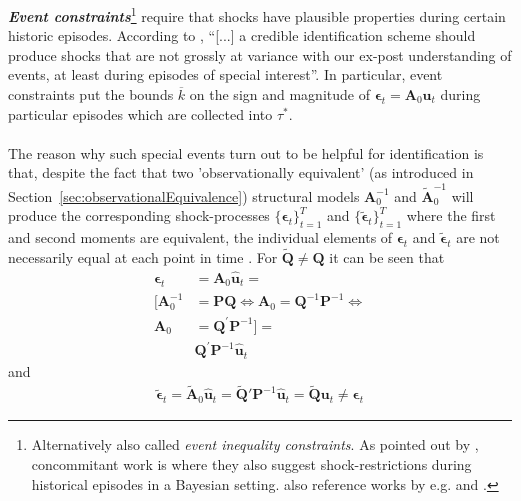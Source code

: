 \documentclass[a4paper,11pt,listof=nochaptergap,oneside,pointednumbers,bibtotoc,bigheadings,liststotoc,hidelinks]{scrbook}
\theoremstyle{mysatz}
\theoremstyle{mydefinition}
\theoremstyle{mytheorem}
\theoremstyle{mybemerkung}
\let\oldhat\hat
\newcommand{\vect}[1]{\boldsymbol{\mathbf{#1}}}
\newcommand{\hatt}[1]{\oldhat{\boldsymbol{\mathbf{#1}}}}
\begin{document}
\textbf{\textit{Event constraints}}\footnote{Alternatively also called \textit{event inequality constraints}. As pointed out by \citet{ludvigsonetal:19}, concommitant work is \citet{diazramirez:18} where they also suggest shock-restrictions during historical episodes in a Bayesian setting. \citet{ludvigsonetal:20a} also reference works by e.g. \citet{cieslakschrimpf:19} and \citet{zeev:18}.} require that shocks have plausible properties during certain historic episodes. According to \citet[p. 11]{ludvigsonetal:19}, ``[...] a credible identification scheme should produce shocks that are not grossly at variance with our ex-post understanding of events, at least during episodes of special interest''.  In particular, event constraints put the bounds $\overline{k}$ on the sign and magnitude of $\vect{\epsilon}_t = \vect{A}_0\vect{u}_t$ during particular episodes which are collected into $\tau^*$. \\
\\
The reason why such special events turn out to be helpful for identification is that, despite the fact that two 'observationally equivalent' (as introduced in Section~\ref{sec:observationalEquivalence}) structural models $\vect{A}_0^{-1}$ and $\widetilde{\vect{A}}_0^{-1}$ will produce the corresponding shock-processes $\big\{\vect{\epsilon}_t\big\}_{t=1}^T$ and $\big\{\widetilde{\vect{\epsilon}}_t\big\}_{t=1}^T$ where the first and second moments are equivalent, the individual elements of $\vect{\epsilon}_t$ and $\widetilde{\vect{\epsilon}}_t$ are not necessarily equal at each point in time \citep{ludvigsonetal:19}. For $\widetilde{\vect{Q}} \neq \vect{Q}$ it can be seen that \citep{ludvigsonetal:19}
\begin{equation} \label{eq:svar_ludvi9}
\begin{split}
\vect{\epsilon}_t & = \vect{A}_0\hatt{\vect{u}}_t = \\
[\vect{A}_0^{-1} & = \vect{P}\vect{Q} \iff \vect{A}_0 = \vect{Q}^{-1}\vect{P}^{-1} \iff \\
\vect{A}_0 & = \vect{Q}^{'}\vect{P}^{-1}] = \\
	& \vect{Q}^'\vect{P}^{-1}\hatt{\vect{u}}_t 
\end{split}								
\end{equation}
and 
\begin{equation} \label{eq:svar_ludvi10}
\begin{split}
\widetilde{\vect{\epsilon}}_t = \widetilde{\vect{A}}_0\hatt{\vect{u}}_t = \widetilde{\vect{Q}}'\vect{P}^{-1}\hatt{\vect{u}}_t = \widetilde{\vect{Q}}\vect{u}_t \neq \vect{\epsilon}_t
\end{split}								
\end{equation}
\end{document}
